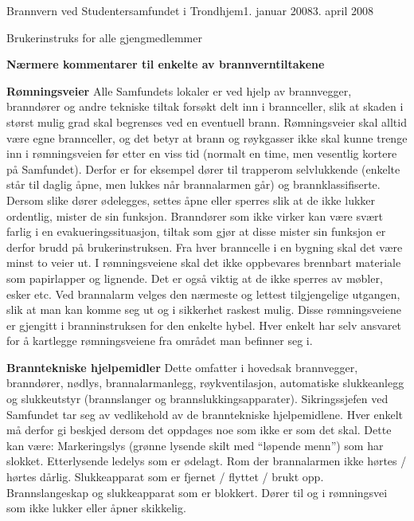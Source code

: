 \begin{instruks}{Brannvern ved Studentersamfundet i Trondhjem}{1. januar 2008}{3. april 2008}
\begin{instruksledd}{Brukerinstruks for alle gjengmedlemmer}
        \begin{center}
            \textbf{Nærmere kommentarer til enkelte av brannverntiltakene} 
        \end{center}
        \begin{description}
            \item \textbf{Rømningsveier} Alle Samfundets lokaler er ved hjelp av brannvegger, branndører og andre tekniske tiltak
                forsøkt delt inn i brannceller, slik at skaden i størst mulig grad skal begrenses ved en eventuell brann.
                Rømningsveier skal alltid være egne brannceller, og det betyr at brann og røykgasser ikke skal kunne trenge inn i
                rømningsveien før etter en viss tid (normalt en time, men vesentlig kortere på Samfundet). Derfor er for eksempel dører til
                trapperom selvlukkende (enkelte står til daglig åpne, men lukkes når brannalarmen går) og brannklassifiserte.
                Dersom slike dører ødelegges, settes åpne eller sperres slik at de ikke lukker ordentlig, mister de sin funksjon.
                Branndører som ikke virker kan være svært farlig i en evakueringssituasjon, tiltak som gjør at disse mister sin funksjon er
                derfor brudd på brukerinstruksen. Fra hver branncelle i en bygning skal det være minst to veier ut. I rømningsveiene skal
                det ikke oppbevares brennbart materiale som papirlapper og lignende. Det er også viktig at de ikke sperres av møbler,
                esker etc. Ved brannalarm velges den nærmeste og lettest tilgjengelige utgangen, slik at man kan
                komme seg ut og i sikkerhet raskest mulig. Disse rømningsveiene er gjengitt i branninstruksen for den enkelte hybel.
                Hver enkelt har selv ansvaret for å kartlegge rømningsveiene fra området man befinner seg i.

            \item \textbf{Branntekniske hjelpemidler} Dette omfatter i hovedsak brannvegger, branndører, nødlys, brannalarmanlegg, røykventilasjon,
                automatiske slukkeanlegg og slukkeutstyr (brannslanger og brannslukkingsapparater).
                Sikringssjefen ved Samfundet tar seg av vedlikehold av de branntekniske hjelpemidlene. Hver enkelt må derfor gi beskjed
                dersom det oppdages noe som ikke er som det skal. Dette kan være: Markeringslys (grønne lysende skilt med ``løpende menn'') som har slokket.
                Etterlysende ledelys som er ødelagt. Rom der brannalarmen ikke hørtes / hørtes dårlig. Slukkeapparat som er fjernet / flyttet / brukt opp.
                Brannslangeskap og slukkeapparat som er blokkert. Dører til og i rømningsvei som ikke lukker eller åpner skikkelig.
        \end{description}

    \end{instruksledd}

\end{instruks}


